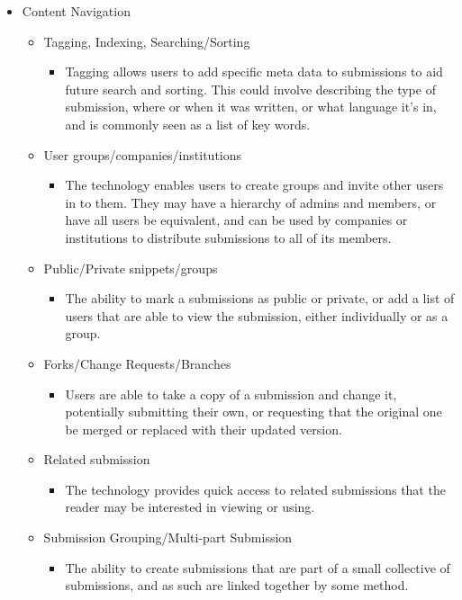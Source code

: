 \begin{itemize}
	\item Content Navigation
	\begin{itemize}
		\item Tagging, Indexing, Searching/Sorting
		\begin{itemize}
			\item Tagging allows users to add specific meta data to submissions to aid future search and sorting.
This could involve describing the type of submission, where or when it was written, or what language it's in, and is commonly seen as a list of key words. 
		\end{itemize}
		\item User groups/companies/institutions
		\begin{itemize}
			\item The technology enables users to create groups and invite other users in to them.
They may have a hierarchy of admins and members, or have all users be equivalent, and can be used by companies or institutions to distribute submissions to all of its members.
		\end{itemize}
		\item Public/Private snippets/groups
		\begin{itemize}
			\item The ability to mark a submissions as public or private, or add a list of users that are able to view the submission, either individually or as a group.
		\end{itemize}
		\item Forks/Change Requests/Branches
		\begin{itemize}
			\item Users are able to take a copy of a submission and change it, potentially submitting their own, or requesting that the original one be merged or replaced with their updated version.
		\end{itemize}
		\item Related submission
		\begin{itemize}
			\item The technology provides quick access to related submissions that the reader may be interested in viewing or using.
		\end{itemize}
		\item Submission Grouping/Multi-part Submission
		\begin{itemize}
			\item The ability to create submissions that are part of a small collective of submissions, and as such are linked together by some method.

\end{itemize}
\end{itemize}
\end{itemize}

